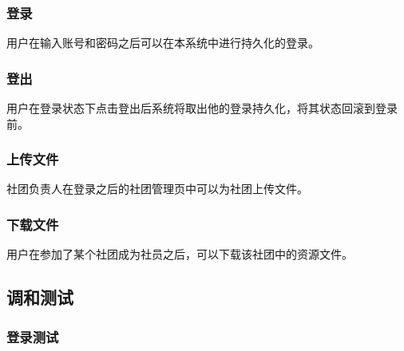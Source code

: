 \documentclass[UTF8]{ctexart}
\begin{document}
\subsubsection{登录}
用户在输入账号和密码之后可以在本系统中进行持久化的登录。
\subsubsection{登出}
用户在登录状态下点击登出后系统将取出他的登录持久化，将其状态回滚到登录前。
\subsubsection{上传文件}
社团负责人在登录之后的社团管理页中可以为社团上传文件。
\subsubsection{下载文件}
用户在参加了某个社团成为社员之后，可以下载该社团中的资源文件。
\subsection{调和测试}
\subsubsection{登录测试}
\end{document}
